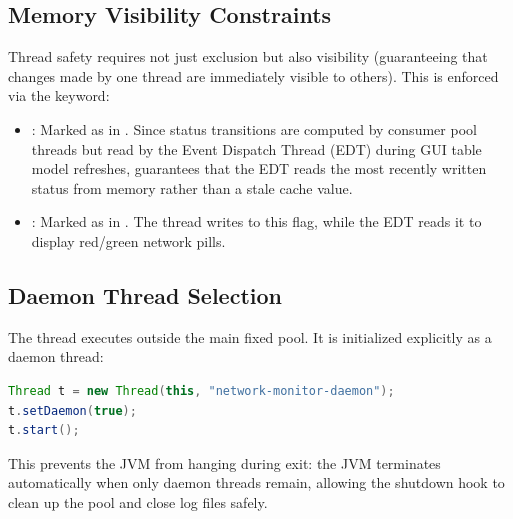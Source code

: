 \subsection{Memory Visibility Constraints}
Thread safety requires not just exclusion but also visibility (guaranteeing that changes made by one thread are immediately visible to others). This is enforced via the  keyword:
\begin{itemize}
    \item {}: Marked as  in . Since status transitions are computed by consumer pool threads but read by the Event Dispatch Thread (EDT) during GUI table model refreshes,  guarantees that the EDT reads the most recently written status from memory rather than a stale cache value.
    \item {}: Marked as  in . The  thread writes to this flag, while the EDT reads it to display red/green network pills.
\end{itemize}

\subsection{Daemon Thread Selection}
The  thread executes outside the main fixed pool. It is initialized explicitly as a daemon thread:
\begin{lstlisting}[language=Java]
Thread t = new Thread(this, "network-monitor-daemon");
t.setDaemon(true);
t.start();
\end{lstlisting}
This prevents the JVM from hanging during exit: the JVM terminates automatically when only daemon threads remain, allowing the shutdown hook to clean up the pool and close log files safely.

